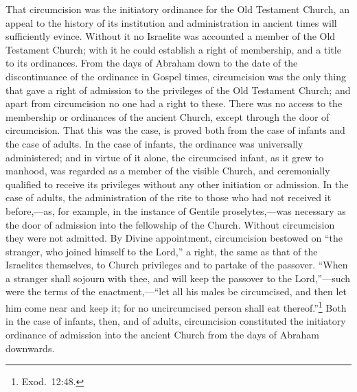 \documentclass[
  english,
]{book}
\begin{document}
That circumcision was the initiatory ordinance for the Old Testament Church, an appeal to the history of its institution and administration in ancient times will sufficiently evince. Without it no Israelite was accounted a member of the Old Testament Church; with it he could establish a right of membership, and a title to its ordinances. From the days of Abraham down to the date of the discontinuance of the ordinance in Gospel times, circumcision was the only thing that gave a right of admission to the privileges of the Old Testament Church; and apart from circumcision no one had a right to these. There was no access to the membership or ordinances of the ancient Church, except through the door of circumcision. That this was the case, is proved both from the case of infants and the case of adults. In the case of infants, the ordinance was universally administered; and in virtue of it alone, the circumcised infant, as it grew to manhood, was regarded as a member of the visible Church, and ceremonially qualified to receive its privileges without any other initiation or admission. In the case of adults, the administration of the rite to those who had not received it before,---as, for example, in the instance of Gentile proselytes,---was necessary as the door of admission into the fellowship of the Church. Without circumcision they were not admitted. By Divine appointment, circumcision bestowed on ``the stranger, who joined himself to the Lord,'' a right, the same as that of the Israelites themselves, to Church privileges and to partake of the passover. ``When a stranger shall sojourn with thee, and will keep the passover to the Lord,''---such were the terms of the enactment,---``let all his males be circumcised, and then let him come near and keep it; for no uncircumcised person shall eat thereof.''\footnote{Exod.~12:48.} Both in the case of infants, then, and of adults, circumcision constituted the initiatory ordinance of admission into the ancient Church from the days of Abraham downwards.
\end{document}
